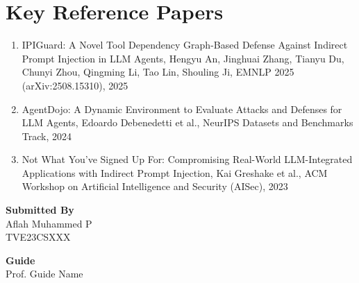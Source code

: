 \documentclass[12pt]{article}
\newcommand{\studentname}{Aflah Muhammed P}
\newcommand{\rollno}{TVE23CSXXX}
\newcommand{\guidename}{Prof. Guide Name}
\begin{document}
\section*{Key Reference Papers}
\begin{enumerate}
  \item IPIGuard: A Novel Tool Dependency Graph-Based Defense Against Indirect Prompt Injection in LLM Agents, Hengyu An, Jinghuai Zhang, Tianyu Du, Chunyi Zhou, Qingming Li, Tao Lin, Shouling Ji, EMNLP 2025 (arXiv:2508.15310), 2025
  \item AgentDojo: A Dynamic Environment to Evaluate Attacks and Defenses for LLM Agents, Edoardo Debenedetti et al., NeurIPS Datasets and Benchmarks Track, 2024
  \item Not What You've Signed Up For: Compromising Real-World LLM-Integrated Applications with Indirect Prompt Injection, Kai Greshake et al., ACM Workshop on Artificial Intelligence and Security (AISec), 2023
\end{enumerate}
\vspace{1.5em}

\noindent\textbf{Submitted By}\\
\studentname\\
\rollno

\vspace{1em}
\noindent\textbf{Guide}\\
\guidename
\end{document}
